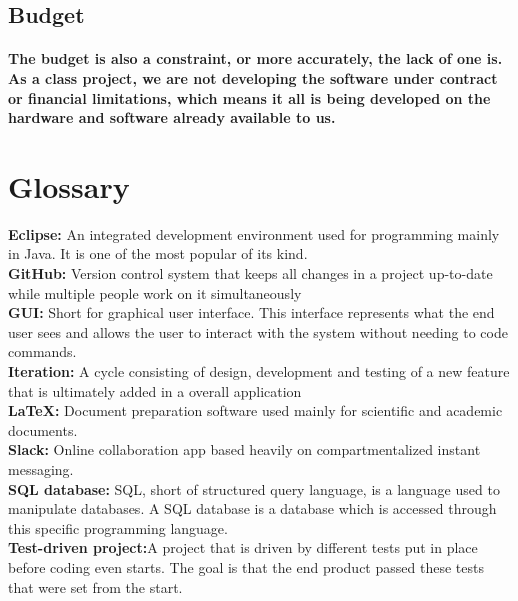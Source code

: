 \documentclass{article}
\begin{document}
\subsection{Budget}
\paragraph{\indent The budget is also a constraint, or more accurately, the lack of one is. As a class project, we are not developing the software under contract or financial limitations, which means it all is being developed on the hardware and software already available to us.}


\newpage
\section {Glossary}

\textbf{\indent Eclipse: }An integrated development environment used for programming mainly in Java. It is one of the most popular of its kind.\\

\textbf{GitHub: }Version control system that keeps all changes in a project up-to-date while multiple people work on it simultaneously \\

\textbf{GUI: }Short for graphical user interface. This interface represents what the end user sees and allows the user to interact with the system without needing to code commands. \\

\textbf{Iteration: }A cycle consisting of design, development and testing of a new feature that is ultimately added in a overall application\\

\textbf{LaTeX: }Document preparation software used mainly for scientific and academic documents.\\

\textbf{Slack: }Online collaboration app based heavily on compartmentalized instant messaging.\\

\textbf{SQL database: }SQL, short of structured query language, is a language used to manipulate databases. A SQL database is a database which is accessed through this specific programming language.\\

\textbf{Test-driven project:}A project that is driven by different tests put in place before coding even starts. The goal is that the end product passed these tests that were set from the start.\\
\end{document}
